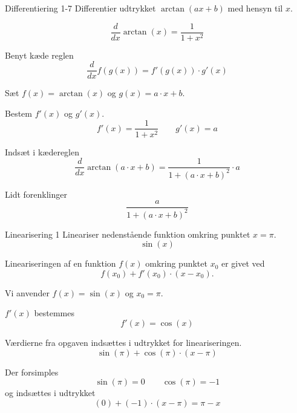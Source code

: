 \documentclass{article}
\begin{document}
\begin{exercise}{Differentiering 1-7}
Differentier udtrykket $\arctan\left( a x + b \right)$ med hensyn til $x$.


\hint
\[
\frac{d}{dx} \arctan(x) = \frac{1}{1 + x^ 2}
\]


\hint
Benyt kæde reglen
\[
\frac{d}{dx} f(g(x)) = f'(g(x)) \cdot g'(x)
\]

\hint
Sæt $f(x) = \arctan(x)$ og $g(x) = a \cdot x + b$.

\hint
Bestem $f'(x)$ og $g'(x)$.
\[
f'(x) = \frac{1}{1 + x^ 2} \qquad g'(x) = a
\]

\hint
Indsæt i kædereglen
\[
\frac{d}{dx} \arctan\left( a \cdot x + b \right) = \frac{1}{1 + \left( a \cdot x + b \right)^2} \cdot a
\]

\hint
Lidt forenklinger
\[
\frac{a}{1 + \left( a \cdot x + b \right)^2}
\]
\end{exercise}


\begin{exercise}{Linearisering 1}
Lineariser nedenstående funktion omkring punktet $x = \pi$.
\[
\sin(x)
\]


\hint
Lineariseringen af en funktion $f(x)$
omkring punktet $x_0$ er givet ved
\[
f(x_0) + f'(x_0) \cdot (x - x_0).
\]

\hint
Vi anvender $f(x) = \sin(x)$ og $x_0 = \pi$.

\hint
$f'(x)$ bestemmes
\[
f'(x) = \cos(x)
\]

\hint
Værdierne fra opgaven indsættes i udtrykket for lineariseringen.
\[
\sin(\pi) + \cos(\pi) \cdot (x - \pi)
\]

\hint
Der forsimples
\[
\sin(\pi) = 0 \qquad
\cos(\pi) = -1
\]
og indsættes i udtrykket
\[
(0) + (-1) \cdot (x - \pi) =
\pi - x
\]

\end{exercise}
\end{document}
